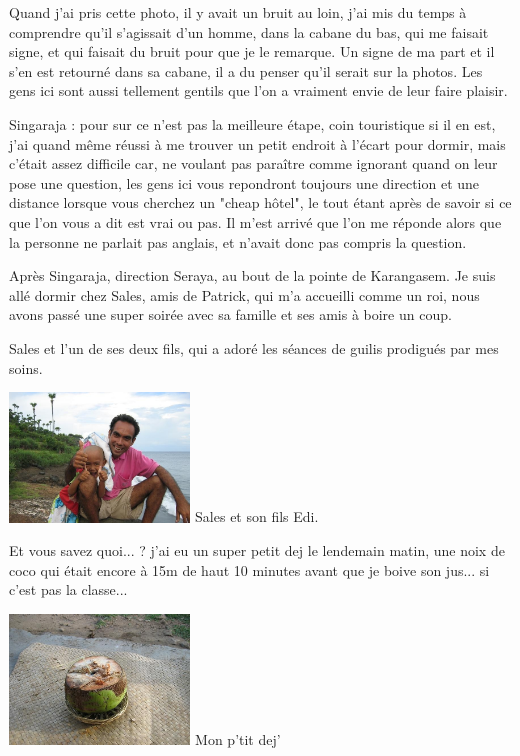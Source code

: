 \begin{multicols}{2}
Quand j'ai pris cette photo, il y avait un bruit au loin, j'ai mis du temps à comprendre qu'il s'agissait d'un homme, dans la cabane du bas, qui me faisait signe, et qui faisait du bruit pour que je le remarque. Un signe de ma part et il s'en est retourné dans sa cabane, il a du penser qu'il serait sur la photos. Les gens ici sont aussi tellement gentils que l'on a vraiment envie de leur faire plaisir.

Singaraja : pour sur ce n'est pas la meilleure étape, coin touristique si il en est, j'ai quand même réussi à me trouver un petit endroit à l'écart pour dormir, mais c'était assez difficile car, ne voulant pas paraître comme ignorant quand on leur pose une question, les gens ici vous repondront toujours une direction et une distance lorsque vous cherchez un "cheap hôtel", le tout étant après de savoir si ce que l'on vous a dit est vrai ou pas. Il m'est arrivé que l'on me réponde alors que la personne ne parlait pas anglais, et n'avait donc pas compris la question.

Après Singaraja, direction Seraya, au bout de la pointe de Karangasem. Je suis allé dormir chez Sales, amis de Patrick, qui m'a accueilli comme un roi, nous avons passé une super soirée avec sa famille et ses amis à boire un coup.

Sales et l'un de ses deux fils, qui a adoré les séances de guilis prodigués par mes soins.

\hspace*{-0.65cm}
\includegraphics[width=4.8cm]{articles/Round-trip-in-bali/1208257303gr5r.jpg}
Sales et son fils Edi.

Et vous savez quoi... ? j'ai eu un super petit dej le lendemain matin, une noix de coco qui était encore à 15m de haut 10 minutes avant que je boive son jus... si c'est pas la classe...

\hspace*{-0.65cm}
\includegraphics[width=4.8cm]{articles/Round-trip-in-bali/1208257299a93l.jpg}
Mon p'tit dej'



\end{multicols}
